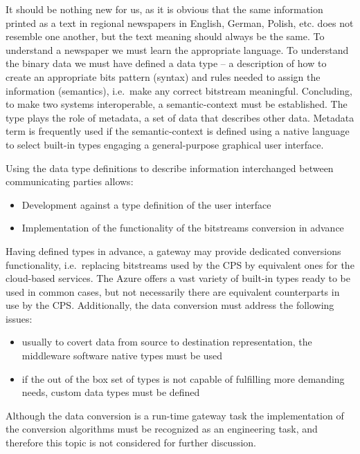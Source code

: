 \documentclass{jacsart}
\begin{document}
It should be nothing new for us, as it is obvious that the same
information printed as a text in regional newspapers in English, German,
Polish, etc. does not resemble one another, but the text meaning should
always be the same. To understand a newspaper we must learn the
appropriate language. To understand the binary data we must have defined
a data type -- a description of how to create an appropriate bits
pattern (syntax) and rules needed to assign the information (semantics),
i.e.~make any correct bitstream meaningful. Concluding, to make two
systems interoperable, a semantic-context must be established. The type
plays the role of metadata, a set of data that describes other data.
Metadata term is frequently used if the semantic-context is defined
using a native language to select built-in types engaging a
general-purpose graphical user interface.

Using the data type definitions to describe information interchanged
between communicating parties allows:

\begin{itemize}
      \item Development against a type definition of the user interface
      \item Implementation of the functionality of the bitstreams conversion in advance
\end{itemize}

Having defined types in advance, a gateway may provide dedicated conversions functionality, i.e.~replacing bitstreams used by the CPS by equivalent ones for the cloud-based services. The Azure offers a vast variety of built-in types ready to be used in common cases, but not necessarily there are equivalent counterparts in use by the CPS. Additionally, the data conversion must address the following issues:

\begin{itemize}
      \item usually to covert data from source to destination representation, the middleware software native types must be used
      \item if the out of the box set of types is not capable of fulfilling more demanding needs, custom data types must be defined
\end{itemize}

Although the data conversion is a run-time gateway task the
implementation of the conversion algorithms must be recognized as an
engineering task, and therefore this topic is not considered for further
discussion.
\end{document}
